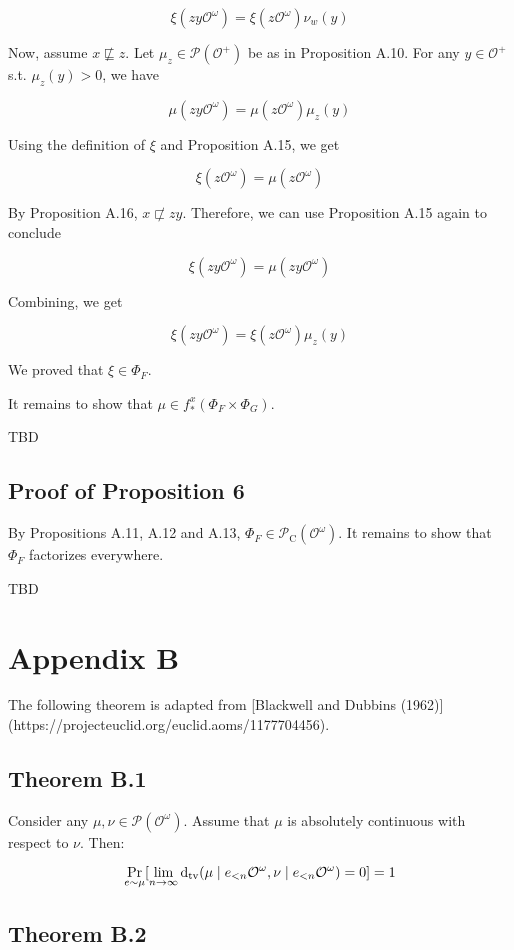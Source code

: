 \documentclass[a4paper]{article}
\DeclareMathOperator{\Prb}{Pr}
\newcommand{\Dtv}{\operatorname{d}_{\textnormal{tv}}}
\newcommand{\Prob}{\mathcal{P}}
\newcommand{\Obs}{\mathcal{O}}
\newcommand{\ObsO}{\Obs^\omega}
\newcommand{\CC}{\mathcal{P}_{\operatorname{C}}}
\begin{document}
$$\xi(zy\ObsO) = \xi(z\ObsO) \nu_w(y)$$

Now, assume ${x \not\sqsubseteq z}$. Let ${\mu_z \in \Prob(\Obs^+)}$ be as in Proposition A.10. For any ${y \in \Obs^+}$ s.t. ${\mu_z(y) > 0}$, we have

$$\mu(zy\ObsO)=\mu(z\ObsO) \mu_z(y)$$

Using the definition of ${\xi}$ and Proposition A.15, we get

$$\xi(z\ObsO)=\mu(z\ObsO)$$

By Proposition A.16, ${x \not\sqsubset zy}$. Therefore, we can use Proposition A.15 again to conclude

$$\xi(zy\ObsO)=\mu(zy\ObsO)$$

Combining, we get

$$\xi(zy\ObsO) = \xi(z\ObsO) \mu_z(y)$$

We proved that ${\xi \in \Phi_F}$.

It remains to show that ${\mu \in f_*^x(\Phi_F \times \Phi_G)}$.

TBD

\subsection{Proof of Proposition 6}

By Propositions A.11, A.12 and A.13, ${\Phi_F \in \CC(\ObsO)}$. It remains to show that ${\Phi_F}$ factorizes everywhere.

TBD

\section{Appendix B}

The following theorem is adapted from [Blackwell and Dubbins (1962)](https://projecteuclid.org/euclid.aoms/1177704456).

\subsection{Theorem B.1}

Consider any ${\mu, \nu \in \Prob(\ObsO)}$. Assume that ${\mu}$ is absolutely continuous with respect to ${\nu}$. Then:

$$\Prb_{e \sim \mu}[\lim_{n \rightarrow \infty} \Dtv(\mu \mid e_{<n}\ObsO, \nu \mid e_{<n}\ObsO) = 0] = 1$$

\subsection{Theorem B.2}
\end{document}
